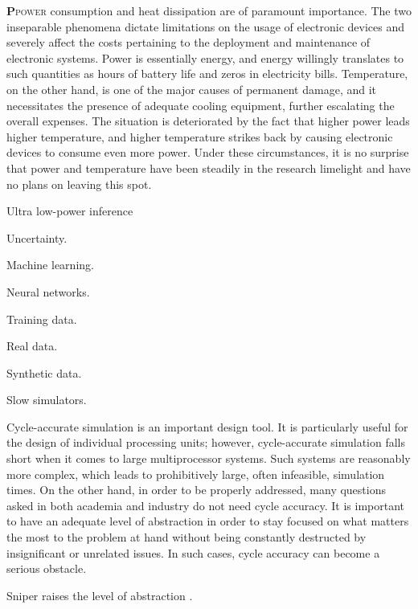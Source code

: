\lettrine[findent=0.4em, nindent=0em]{\textbf{P}}{power} consumption and heat
dissipation are of paramount importance. The two inseparable phenomena dictate
limitations on the usage of electronic devices and severely affect the costs
pertaining to the deployment and maintenance of electronic systems. Power is
essentially energy, and energy willingly translates to such quantities as hours
of battery life and zeros in electricity bills. Temperature, on the other hand,
is one of the major causes of permanent damage, and it necessitates the presence
of adequate cooling equipment, further escalating the overall expenses. The
situation is deteriorated by the fact that higher power leads higher
temperature, and higher temperature strikes back by causing electronic devices
to consume even more power. Under these circumstances, it is no surprise that
power and temperature have been steadily in the research limelight and have no
plans on leaving this spot.

Ultra low-power inference \cite{park2015}

Uncertainty.

Machine learning.

Neural networks.

Training data.

Real data.

Synthetic data.

Slow simulators.

Cycle-accurate simulation is an important design tool. It is particularly useful
for the design of individual processing units; however, cycle-accurate
simulation falls short when it comes to large multiprocessor systems. Such
systems are reasonably more complex, which leads to prohibitively large, often
infeasible, simulation times. On the other hand, in order to be properly
addressed, many questions asked in both academia and industry do not need cycle
accuracy. It is important to have an adequate level of abstraction in order to
stay focused on what matters the most to the problem at hand without being
constantly destructed by insignificant or unrelated issues. In such cases, cycle
accuracy can become a serious obstacle.

Sniper raises the level of abstraction \cite{carlson2011}.
